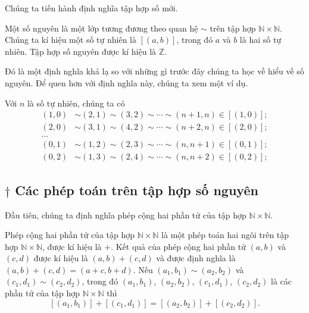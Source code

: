 Chúng ta tiến hành định nghĩa tập hợp số mới.
\begin{definition}
	Một số nguyên là một lớp tương đương theo quan hệ $\sim$ trên tập hợp $\mathbb{N}\times\mathbb{N}$. Chúng ta kí hiệu một số tự nhiên là $[(a, b)]$, trong đó $a$ và $b$ là hai số tự nhiên. Tập hợp số nguyên được kí hiệu là $\mathbb{Z}$.
\end{definition}

Đó là một định nghĩa khá lạ so với những gì trước đây chúng ta học về hiểu về số nguyên. Để quen hơn với định nghĩa này, chúng ta xem một ví dụ.
\begin{example}
	Với $n$ là số tự nhiên, chúng ta có
	\begin{align*}
		(1, 0) & \sim (2, 1) \sim (3, 2) \sim \cdots \sim (n+1, n) \in [(1, 0)]; \\
		(2, 0) & \sim (3, 1) \sim (4, 2) \sim \cdots \sim (n+2, n) \in [(2, 0)]; \\
		\ldots                                                                   \\
		(0, 1) & \sim (1, 2) \sim (2, 3) \sim \cdots \sim (n, n+1) \in [(0, 1)]; \\
		(0, 2) & \sim (1, 3) \sim (2, 4) \sim \cdots \sim (n, n+2) \in [(0, 2)];
	\end{align*}
\end{example}

\subsection*{$\dagger$ Các phép toán trên tập hợp số nguyên}

Đầu tiên, chúng ta định nghĩa phép cộng hai phần tử của tập hợp $\mathbb{N}\times\mathbb{N}$.
\begin{proposition}
	Phép cộng hai phần tử của tập hợp $\mathbb{N}\times\mathbb{N}$ là một phép toán hai ngôi trên tập hợp $\mathbb{N}\times\mathbb{N}$, được kí hiệu là $+$. Kết quả của phép cộng hai phần tử $(a, b)$ và $(c, d)$ được kí hiệu là $(a, b) + (c, d)$ và được định nghĩa là $(a, b) + (c, d) = (a+c, b+d)$. Nếu $(a_{1}, b_{1}) \sim (a_{2}, b_{2})$ và $(c_{1}, d_{1})\sim (c_{2}, d_{2})$, trong đó $(a_{1}, b_{1})$, $(a_{2}, b_{2})$, $(c_{1}, d_{1})$, $(c_{2}, d_{2})$ là các phần tử của tập hợp $\mathbb{N}\times\mathbb{N}$ thì
	\[
		[(a_{1}, b_{1})] + [(c_{1}, d_{1})] = [(a_{2}, b_{2})] + [(c_{2}, d_{2})].
	\]
\end{proposition}

